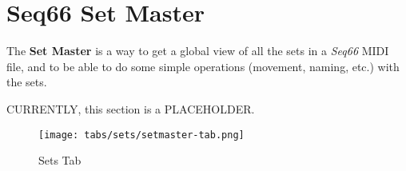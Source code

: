 %
%
%

\section{Seq66 Set Master}
\label{sec:setmaster}

   The \textbf{Set Master} is a way to get a global view of all the sets in a
   \textsl{Seq66} MIDI file, and to be able to do some simple operations
   (movement, naming, etc.) with the sets.

   CURRENTLY, this section is a PLACEHOLDER.

\begin{figure}[H]
   \centering 
   \texttt{[image: tabs/sets/setmaster-tab.png]}
   \caption{Sets Tab}
   \label{fig:setmaster_tab}
\end{figure}

